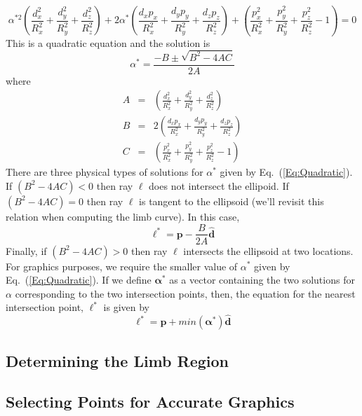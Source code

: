 %
\begin{equation}
    \alpha^{*2}\left( \frac{d_x^2}{R_x^2} + \frac{d_y^2}{R_y^2} + \frac{d_z^2}{R_z^2} \right) +
    2\alpha^{*}\left( \frac{d_x p_x}{R_x^2} + \frac{d_y p_y}{R_y^2} + \frac{d_z p_z}{R_z^2} \right)+
    \left( \frac{p_x^2}{R_x^2} + \frac{p_y^2}{R_y^2} + \frac{p_z^2}{R_z^2} - 1\right) = 0
\end{equation}
%
This is a quadratic equation and the solution is 
%
\begin{equation}
    \alpha^* = \frac{-B \pm \sqrt{B^2 - 4 A C}}{2A}\label{Eq:Quadratic}
\end{equation}
%
where 
%
\begin{eqnarray}
    A &=& \left( \frac{d_x^2}{R_x^2} + \frac{d_y^2}{R_y^2} + \frac{d_z^2}{R_z^2} \right)\\
    B &=& 2\left( \frac{d_x p_x}{R_x^2} + \frac{d_y p_y}{R_y^2} + \frac{d_z p_z}{R_z^2} \right)\\
    C &=& \left( \frac{p_x^2}{R_x^2} + \frac{p_y^2}{R_y^2} + \frac{p_z^2}{R_z^2} - 1\right) 
\end{eqnarray}
%
There are three physical types of solutions for $\alpha^*$ given by Eq.~(\ref{Eq:Quadratic}).  If $(B^2 - 4 A C) < 0$ then ray $\boldsymbol\ell$ does not intersect
the ellipoid.  If $(B^2 - 4 A C) = 0$ then ray $\boldsymbol\ell$ is tangent to the ellipsoid (we'll revisit this relation when computing the limb curve). In this case,
%
\begin{equation}
    \boldsymbol{\ell}^* = \mathbf{p} -\frac{B}{2A}\hat{\mathbf{d}} 
\end{equation}
%
Finally, if $(B^2 - 4 A C) > 0$ then ray $\boldsymbol\ell$ intersects the ellipsoid
at two locations.  For graphics purposes, we require the smaller value of $\alpha^*$ given by Eq.~(\ref{Eq:Quadratic}). If we define $\boldsymbol\alpha^*$ as a vector containing the two solutions for $\alpha$ corresponding to the two intersection points, then, the equation for the nearest intersection point, $\boldsymbol{\ell}^*$ is given by
%
\begin{equation}
    \boldsymbol{\ell}^* = \mathbf{p} + min(\boldsymbol\alpha^*)\hat{\mathbf{d}} 
\end{equation}

\subsection{Determining the Limb Region}

\subsection{Selecting Points for Accurate Graphics}